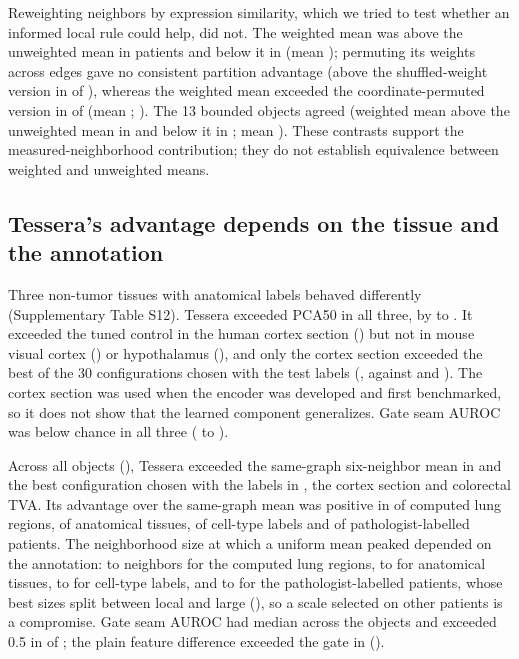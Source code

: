 Reweighting neighbors by expression similarity, which we tried to test whether an informed local rule could help, did not. The weighted mean was above the unweighted mean in \HerBndEUSixPos{} patients and below it in \HerBndEUSixNeg{} (mean \HerBndEUSixMean{}); permuting its weights across edges gave no consistent partition advantage (above the shuffled-weight version in \HerBndEShufPos{} of \HerPatients{}), whereas the weighted mean exceeded the coordinate-permuted version in \HerBndECoordPos{} of \HerPatients{} (mean \HerBndECoordMean{}; ). The 13 bounded objects agreed (weighted mean above the unweighted mean in \DevAllThirteenEMeanPos{} and below it in \DevAllThirteenEMeanNeg{}; mean \DevAllThirteenEMeanMean{}). These contrasts support the measured-neighborhood contribution; they do not establish equivalence between weighted and unweighted means.





\subsection{Tessera's advantage depends on the tissue and the annotation}
Three non-tumor tissues with anatomical labels behaved differently (Supplementary Table S12). Tessera exceeded PCA50 in all three, by \BrPcaGainMin{} to \BrPcaGainMax{}. It exceeded the tuned control in the human cortex section (\BrCortexTessNested{}) but not in mouse visual cortex (\BrStarmapTessNested{}) or hypothalamus (\BrMerfishTessNested{}), and only the cortex section exceeded the best of the 30 configurations chosen with the test labels (\BrCortexTessOracle{}, against \BrStarmapTessOracle{} and \BrMerfishTessOracle{}). The cortex section was used when the encoder was developed and first benchmarked, so it does not show that the learned component generalizes. Gate seam AUROC was below chance in all three (\BrGateMin{} to \BrGateMax{}).

Across all \LandN{} objects (), Tessera exceeded the same-graph six-neighbor mean in \LandTessSamePos{} and the best configuration chosen with the labels in \LandTessOraclePos{}, the cortex section and colorectal TVA. Its advantage over the same-graph mean was positive in \LandComputedSamePos{} of \LandComputedN{} computed lung regions, \LandAnatSamePos{} of \LandAnatN{} anatomical tissues, \LandCellSamePos{} of \LandCellN{} cell-type labels and \LandPathSamePos{} of \LandPathN{} pathologist-labelled patients. The neighborhood size at which a uniform mean peaked depended on the annotation: \LandComputedKMin{} to \LandComputedKMax{} neighbors for the computed lung regions, \LandAnatKMin{} to \LandAnatKMax{} for anatomical tissues, \LandCellKMin{} to \LandCellKMax{} for cell-type labels, and \LandPathKMin{} to \LandPathKMax{} for the pathologist-labelled patients, whose best sizes split between local and large (), so a scale selected on other patients is a compromise. Gate seam AUROC had median \LandGateMedian{} across the objects and exceeded 0.5 in \LandGateAbove{} of \LandN{}; the plain feature difference exceeded the gate in \LandRawOverGate{} ().



